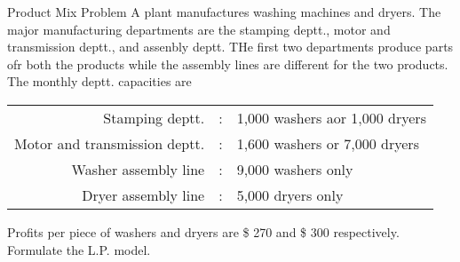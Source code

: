\begin{frameExample}{Product Mix Problem}{}
  A plant manufactures washing machines and dryers. The major manufacturing departments are the stamping deptt., motor and transmission deptt., and assenbly deptt. THe first two departments produce parts ofr both the products while the assembly lines are different for the two products. The monthly deptt. capacities are

  {
    \centering
    \begin{tabular}{rll}
      Stamping deptt. &:& 1,000 washers aor 1,000 dryers\\
      Motor and transmission deptt. &:& 1,600 washers or 7,000 dryers\\
      Washer assembly line &:& 9,000 washers only\\
      Dryer assembly line &:& 5,000 dryers only
    \end{tabular}
    \par
  }

  Profits per piece of washers and dryers are \$ 270 and \$ 300 respectively. Formulate the L.P. model.
\end{frameExample}




